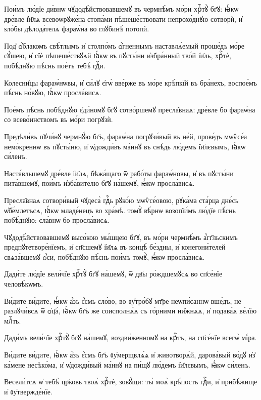 \hKv Пои́мъ лю́дїе ди́внѡ чꙋдодѣ́йствовавшемꙋ въ чермнѣ́мъ  мо́ри хрⷭ҇тꙋ̀ бг҃ꙋ: ꙗ҆́кѡ дре́вле і҆и҃лѧ всевоѡрꙋже́на  стопа́ми пѣшеше́ствовати непрохо́днꙋю сотворѝ, и҆ ѕло́бы  дѣлода́телѧ фараѡ́на во глꙋбинѣ̀ потопѝ. 

\hKv Под̾ ѻ҆́блакомъ свѣ́тлымъ и҆ столпо́мъ ѻ҆́гненнымъ  наставлѧ́емый проше́дъ мо́ре   сꙋ́шею, и҆ сїѐ пѣшеше́ствꙋѧй ꙗ҆́кѡ въ пꙋсты́ни  и҆збра́нный тво́й і҆и҃ль, хрⷭ҇тѐ, побѣ́днꙋю пѣ́снь пое́тъ  тебѣ̀ гдⷭ҇и. 

\hKv Колесни̑цы фараѡ́нѡвы, и҆ си́лꙋ є҆гѡ̀ вве́рже въ мо́ре  крѣ́пкїй въ бра́нехъ, воспое́мъ пѣ́снь но́вꙋю, ꙗ҆́кѡ  просла́висѧ. 

\hKv Пое́мъ пѣ́снь побѣ́днꙋю є҆ди́номꙋ бг҃ꙋ сотво́ршемꙋ  пресла̑внаѧ: дре́вле бо фараѡ́на со всево́инствомъ въ мо́ри  погрꙋзѝ. 

\hKv Предѣли́въ пꙋчи́нꙋ чермнꙋ́ю бг҃ъ, фараѡ́на погрꙋзи́вый въ  не́й, прове́дъ мѡѷсе́а немо́креннѡ въ пꙋсты́ню, и҆  ѡ҆дожди́въ ма́ннꙋ въ снѣ́дь лю́демъ і҆и҃лєвымъ, ꙗ҆́кѡ  си́ленъ. 

\hKv Наста́вльшемꙋ дре́вле і҆и҃лѧ, бѣжа́щаго ѿ рабо́ты  фараѡ́новы, и҆ въ пꙋсты́ни пита́вшемꙋ, пои́мъ и҆зба́вителю  бг҃ꙋ на́шемꙋ, ꙗ҆́кѡ просла́висѧ. 

\hKv Пресла̑внаѧ сотвори́вый чꙋдеса̀ гдⷭ҇ь рꙋко́ю мѡѷсе́овою,  рꙋка́ма ста́рца дне́сь ѡ҆б̾е́млетъсѧ, ꙗ҆́кѡ младе́нецъ во  хра́мѣ. томꙋ̀ вѣ́рнѡ   возопїи́мъ лю́дїе пѣ́снь побѣ́днꙋю: сла́внѡ бо  просла́висѧ. 

\hKv Чꙋдодѣ́йствовавшемꙋ высо́кою мы́шцею бг҃ꙋ, въ мо́ри  чермнѣ́мъ а҆́гг҃льскимъ предпꙋтетворе́нїемъ, и҆ сп҃сшемꙋ  і҆и҃лѧ въ концѣ̀ бе́здны, и҆ конегони́телей свѧза́вшемꙋ  ѻ҆́си, побѣ́днꙋю пѣ́снь пои́мъ томꙋ̀, ꙗ҆́кѡ просла́висѧ. 
%

\hKv Дади́те лю́дїе вели́чїе хрⷭ҇тꙋ̀ бг҃ꙋ на́шемꙋ, ѿ дв҃ы  ро́ждшемꙋсѧ во сп҃се́нїе человѣ́кѡмъ. 

\hKv Ви́дите ви́дите, ꙗ҆́кѡ а҆́зъ є҆́смь сло́во, во ᲂу҆тро́бꙋ  мт҃ре неѡпи́саннѡ вше́дъ, не разлꙋчи́всѧ ѿ ѻ҆ц҃а̀, ꙗ҆́кѡ  бг҃ъ же соисполнѧ́ѧ съ го́рними ни̑жнѧѧ, и҆ подава́ѧ ве́лїю  млⷭ҇ть. 

\hKv Дади́мъ вели́чїе хрⷭ҇тꙋ̀ бг҃ꙋ на́шемꙋ, воздви́женномꙋ на  крⷭ҇тъ, на сп҃се́нїе всегѡ̀ мі́ра.  

\hKv Ви́дите ви́дите, ꙗ҆́кѡ а҆́зъ є҆́смь бг҃ъ ᲂу҆мерщвлѧ́ѧ и҆  животворѧ́й, дарова́вый во́дꙋ и҆з̾ ка́мене несѣко́ма, и҆  ѡ҆дожди́вый ма́ннꙋ на пи́щꙋ лю́демъ і҆и҃лєвымъ, ꙗ҆́кѡ  си́ленъ. 
%

\hKv Весели́тсѧ ѡ҆ тебѣ̀ цр҃ковь твоѧ̀ хрⷭ҇тѐ, зовꙋ́щи: ты̀  моѧ̀ крѣ́пость гдⷭ҇и, и҆ прибѣ́жище и҆ ᲂу҆твержде́нїе. 
%

